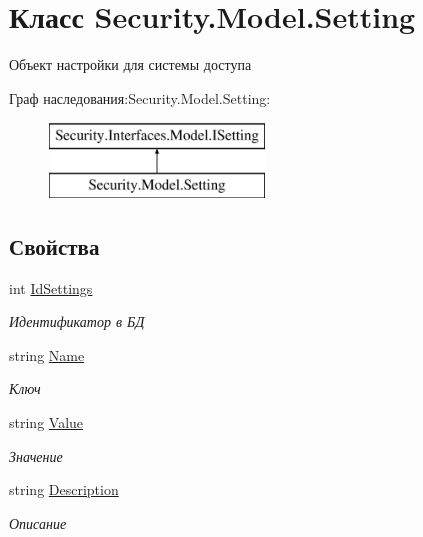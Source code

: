 \hypertarget{class_security_1_1_model_1_1_setting}{}\section{Класс Security.\+Model.\+Setting}
\label{class_security_1_1_model_1_1_setting}


Объект настройки для системы доступа  


Граф наследования\+:Security.\+Model.\+Setting\+:\begin{figure}[H]
\begin{center}
\leavevmode
\includegraphics[height=2.000000cm]{d9/dad/class_security_1_1_model_1_1_setting}
\end{center}
\end{figure}
\subsection*{Свойства}
\begin{DoxyCompactItemize}
\item 
int \hyperlink{class_security_1_1_model_1_1_setting_ab763237ec018416e9c5adde3e5e9a47d}{Id\+Settings}
\begin{DoxyCompactList}\small\item\em Идентификатор в БД \end{DoxyCompactList}\item 
string \hyperlink{class_security_1_1_model_1_1_setting_a4fb31fdfd098e578413d80c0d9b9cd22}{Name}
\begin{DoxyCompactList}\small\item\em Ключ \end{DoxyCompactList}\item 
string \hyperlink{class_security_1_1_model_1_1_setting_ace5141b561fd0a150a8342d17faf79d7}{Value}
\begin{DoxyCompactList}\small\item\em Значение \end{DoxyCompactList}\item 
string \hyperlink{class_security_1_1_model_1_1_setting_a9cf69ac2ea5428fbd360801678327ad8}{Description}
\begin{DoxyCompactList}\small\item\em Описание \end{DoxyCompactList}\end{DoxyCompactItemize}


